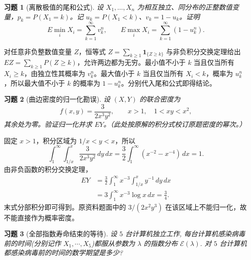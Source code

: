 \documentclass[UTF8,12pt,a4paper,fontset=fandol]{ctexart}
\newtheorem{exercise}{习题}[section]
\begin{document}
\begin{exercise}[离散极值的尾和公式]\label{q:A5.12}
设 $X_1,\ldots,X_n$ 为相互独立、同分布的正整数值变量，$p_k=P(X_1=k)$。记 $u_k=P(X_1<k)$、$v_k=1-u_k$。证明\[E\min_iX_i=\sum_{k=1}^\infty v_k^n,\qquad E\max_iX_i=\sum_{k=1}^\infty(1-u_k^n).\]\par{}
\end{exercise}

\begin{solve}\label{a:A5.12}对任意非负整数值变量 $Z$，恒等式 $Z=\sum_{k\ge1}\mathbf1_{\{Z\ge k\}}$ 与非负积分交换定理给出 $EZ=\sum_{k\ge1}P(Z\ge k)$，允许两边都为无穷。最小值不小于 $k$ 当且仅当所有 $X_i\ge k$，由独立性其概率为 $v_k^n$。最大值小于 $k$ 当且仅当所有 $X_i<k$，概率为 $u_k^n$，所以最大值不小于 $k$ 的概率为 $1-u_k^n$。分别代入尾和公式即得结论。\end{solve}

\begin{exercise}[曲边密度的归一化勘误]\label{q:A5.14}
设 $(X,Y)$ 的联合密度为\[f(x,y)=\frac{3}{2x^3y^2},\qquad x>1,\quad 1<xy<x^2,\]其余处为零。验证归一化并求 $EY$。（此处按原解的积分式校订原题密度的幂次。）\par{}
\end{exercise}

\begin{solve}\label{a:A5.14}固定 $x>1$，积分区域为 $1/x<y<x$，所以\[\int_1^\infty\!\int_{1/x}^{x}\frac{3}{2x^3y^2}\,dy\,dx=\frac32\int_1^\infty(x^{-2}-x^{-4})\,dx=1.\]由非负函数的积分交换定理，\[\begin{aligned}EY&=\frac32\int_1^\infty x^{-3}\!\int_{1/x}^x y^{-1}\,dy\,dx\\&=3\int_1^\infty x^{-3}\log x\,dx=\frac34.\end{aligned}\]末式分部积分即可得到。原资料题面中的 $3/(2x^2y^3)$ 在该区域上不能归一化，故不能直接作为概率密度。\end{solve}

\begin{exercise}[全部指数寿命结束的等待]\label{q:A5.17}
设 $5$ 台计算机独立工作, 每台计算机感染病毒前的时间(分别记作 $X_1,\cdots,X_5$)都服从参数为 $\lambda$ 的指数分布 $\mathcal{E}(\lambda)$. 对 $5$ 台计算机都感染病毒前的时间的数学期望是多少?\par{}
\end{exercise}
\end{document}
